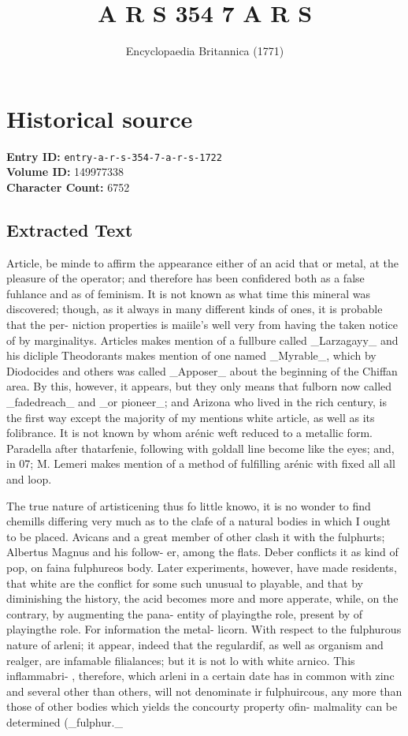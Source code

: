 \documentclass{article}
\title{A R S 354 7 A R S}
\date{Encyclopaedia Britannica (1771)}
\begin{document}
\maketitle

\section*{Historical source}
\textbf{Entry ID:} \texttt{entry-a-r-s-354-7-a-r-s-1722} \\
\textbf{Volume ID:} 149977338 \\
\textbf{Character Count:} 6752

\subsection*{Extracted Text}
Article, be minde to affirm the appearance either of an acid that or metal, at the pleasure of the operator; and therefore has been confidered both as a false fuhlance and as of feminism. It is not known as what time this mineral was discovered; though, as it always in many different kinds of ones, it is probable that the per- niction properties is maiile’s well very from having the taken notice of by marginalitys. Articles makes mention of a fullbure called \_Larzagayy\_ and his dicliple Theodorants makes mention of one named \_Myrable\_, which by Diodocides and others was called \_Apposer\_ about the beginning of the Chiffan area. By this, however, it appears, but they only means that fulborn now called \_fadedreach\_ and \_or pioneer\_; and Arizona who lived in the rich century, is the first way except the majority of my mentions white article, as well as its folibrance. It is not known by whom arénic weft reduced to a metallic form. Paradella after thatarfenie, following with goldall line become like the eyes; and, in 07; M. Lemeri makes mention of a method of fulfilling arénic with fixed all all and loop.

The true nature of artisticening thus fo little knowo, it is no wonder to find chemills differing very much as to the clafe of a natural bodies in which I ought to be placed. Avicans and a great member of other clash it with the fulphurts; Albertus Magnus and his follow- er, among the flats. Deber conflicts it as kind of pop, on faina fulphureos body. Later experiments, however, have made residents, that white are the conflict for some such unusual to playable, and that by diminishing the history, the acid becomes more and more apperate, while, on the contrary, by augmenting the pana- entity of playingthe role, present by of playingthe role. For information the metal- licorn. With respect to the fulphurous nature of arleni; it appear, indeed that the regulardif, as well as organism and realger, are infamable filialances; but it is not lo with white arnico. This inflammabri- , therefore, which arleni in a certain date has in common with zinc and several other than others, will not denominate ir fulphuircous, any more than those of other bodies which yields the concourty property ofin- malmality can be determined (\_fulphur.\_
\end{document}

